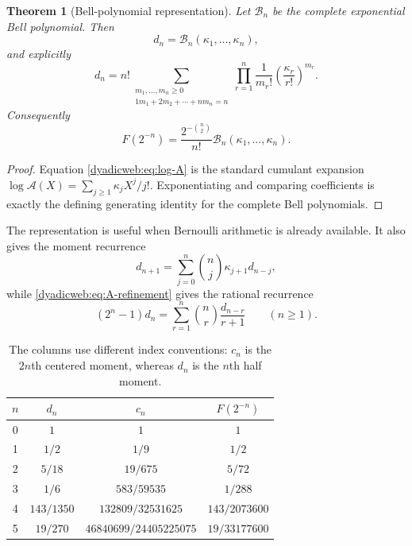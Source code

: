 \documentclass[11pt,oneside]{article}
\newtheorem{theorem}{Theorem}[section]
\theoremstyle{definition}
\theoremstyle{remark}
\begin{document}
\begin{theorem}[Bell-polynomial representation]
\label{dyadicweb:thm:bell-d}
Let $\mathcal B_n$ be the complete exponential Bell polynomial.  Then
\begin{equation}
 d_n=\mathcal B_n(\kappa_1,\ldots,\kappa_n),               \label{dyadicweb:eq:bell-d}
\end{equation}
and explicitly
\begin{equation}
 d_n=n!\!
 \sum_{\substack{m_1,\ldots,m_n\ge0\\
                  1m_1+2m_2+\cdots+nm_n=n}}
 \prod_{r=1}^{n}\frac1{m_r!}
 \left(\frac{\kappa_r}{r!}\right)^{m_r}.                 \label{dyadicweb:eq:partition-d}
\end{equation}
Consequently
\begin{equation}
 \boxed{
 F(2^{-n})=\frac{2^{-\binom n2}}{n!}
 \mathcal B_n(\kappa_1,\ldots,\kappa_n).}                 \label{dyadicweb:eq:inverse-bell}
\end{equation}
\end{theorem}

\begin{proof}
Equation \eqref{dyadicweb:eq:log-A} is the standard cumulant expansion
$\log\mathscr A(X)=\sum_{j\ge1}\kappa_jX^j/j!$.  Exponentiating and comparing coefficients
is exactly the defining generating identity for the complete Bell polynomials.
\end{proof}

The representation is useful when Bernoulli arithmetic is already available.  It also gives
the moment recurrence
\begin{equation}
 d_{n+1}=\sum_{j=0}^{n}\binom nj\kappa_{j+1}d_{n-j},       \label{dyadicweb:eq:cumulant-moment-recurrence}
\end{equation}
while \eqref{dyadicweb:eq:A-refinement} gives the rational recurrence
\begin{equation}
 (2^n-1)d_n
 =\sum_{r=1}^{n}\binom nr\frac{d_{n-r}}{r+1}
 \qquad(n\ge1).                                           \label{dyadicweb:eq:d-recurrence-companion}
\end{equation}

\begin{table}[ht]
\centering
\small
\begin{tabular}{@{}c c c c@{}}
\toprule
$n$ & $d_n$ & $c_n$ & $F(2^{-n})$ \\
\midrule
0 & $1$ & $1$ & $1$ \\
1 & $1/2$ & $1/9$ & $1/2$ \\
2 & $5/18$ & $19/675$ & $5/72$ \\
3 & $1/6$ & $583/59535$ & $1/288$ \\
4 & $143/1350$ & $132809/32531625$ & $143/2073600$ \\
5 & $19/270$ & $46840699/24405225075$ & $19/33177600$ \\
\bottomrule
\end{tabular}
\caption{The columns use different index conventions: $c_n$ is the $2n$th centered moment,
whereas $d_n$ is the $n$th half moment.}
\label{dyadicweb:tab:moments}
\end{table}
\end{document}
